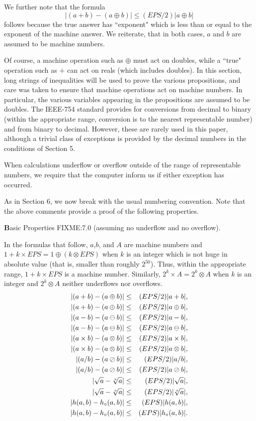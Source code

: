 \begin{definition}
We further note that the formula 
$$|(a + b) - (a \oplus b)| \leq (EPS/2) |a \oplus b|$$
follows because the true answer has ``exponent" which is less than or equal to the exponent of the machine answer.  We reiterate, that in both cases, $a$ and $b$ are assumed to be machine numbers.

Of course, a machine operation such as $\oplus$ must act on doubles, while a ``true" operation such as $+$ can act on reals (which includes doubles).
In this section, long strings of inequalities will be used to prove the various propositions, and care was taken to ensure that machine operations act on machine numbers.  In particular, the various variables appearing in the propositions are assumed to be doubles. The IEEE-754 standard provides for conversions from decimal to binary (within the appropriate range, conversion is to the nearest representable number) and from binary to decimal.  However, these are rarely used in this paper, although a trivial class of exceptions is provided by the decimal numbers in the conditions of
Section 5.

When calculations underflow or overflow outside of the range of representable numbers, we require that the computer inform us if either exception has occurred.  

As in Section 6, we now break with the usual numbering convention.  Note that the above comments provide a proof of the
following properties.

 {\textbf Basic Properties FIXME:7.0 (assuming no underflow and no overflow)}.

In the formulas that follow, $a$,$b$, and $A$ are machine numbers and
$1 + k \times EPS = 1 \oplus (k \otimes EPS)$ when $k$ is an integer which is not huge in absolute value (that is, 
smaller than roughly $2^{50}$).  Thus, within the appropriate range,  $1 + k \times EPS$ is a machine number.  Similarly,
$2^k
\times A = 2^k \otimes A$ when $k$ is an integer and  $2^k \otimes A$ neither underflows nor overflows.
\begin{eqnarray*}
|(a + b) - (a \oplus b)| &\leq& (EPS/2) |a + b|,\\
|(a + b) - (a \oplus b)|&\leq& (EPS/2) |a \oplus b|,\\
|(a - b) - (a \ominus b)| &\leq& (EPS/2) |a - b|,\\
|(a - b) - (a \ominus b)|&\leq& (EPS/2) |a \ominus b|,\\
|(a \times b) - (a \otimes b)| &\leq& (EPS/2) |a \times b|,\\
|(a \times b) - (a \otimes b)| &\leq&(EPS/2) |a \otimes b|,\\
|(a / b) - (a \oslash b)| &\leq& (EPS/2) |a / b|,\\
|(a / b) - (a \oslash b)| &\leq& (EPS/2) |a \oslash b|,\\
|\sqrt a - \root o \of a| &\leq& (EPS/2) |\sqrt a|,\\
|\sqrt a - \root o \of a|  &\leq&  (EPS/2) |\root o \of a|,\\
|h(a,b) - h_\circ(a,b)| &\leq& (EPS) |h(a,b)|,\\
|h(a,b) - h_\circ(a,b)| &\leq&   (EPS) |h_\circ(a,b)|.
\end{eqnarray*}


\end{definition}
